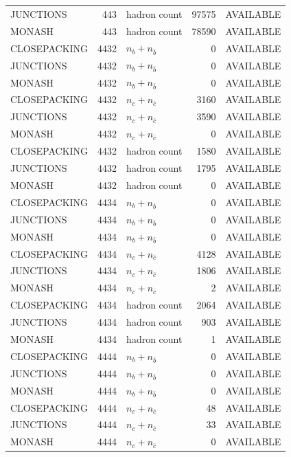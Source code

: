 \begin{landscape}
\begin{longtable}{@{}lrlrl@{}}
JUNCTIONS & 443 & hadron count & \num{97575} & AVAILABLE \\
MONASH & 443 & hadron count & \num{78590} & AVAILABLE \\
CLOSEPACKING & 4432 & $n_b+n_{\bar b}$ & \num{0} & AVAILABLE \\
JUNCTIONS & 4432 & $n_b+n_{\bar b}$ & \num{0} & AVAILABLE \\
MONASH & 4432 & $n_b+n_{\bar b}$ & \num{0} & AVAILABLE \\
CLOSEPACKING & 4432 & $n_c+n_{\bar c}$ & \num{3160} & AVAILABLE \\
JUNCTIONS & 4432 & $n_c+n_{\bar c}$ & \num{3590} & AVAILABLE \\
MONASH & 4432 & $n_c+n_{\bar c}$ & \num{0} & AVAILABLE \\
CLOSEPACKING & 4432 & hadron count & \num{1580} & AVAILABLE \\
JUNCTIONS & 4432 & hadron count & \num{1795} & AVAILABLE \\
MONASH & 4432 & hadron count & \num{0} & AVAILABLE \\
CLOSEPACKING & 4434 & $n_b+n_{\bar b}$ & \num{0} & AVAILABLE \\
JUNCTIONS & 4434 & $n_b+n_{\bar b}$ & \num{0} & AVAILABLE \\
MONASH & 4434 & $n_b+n_{\bar b}$ & \num{0} & AVAILABLE \\
CLOSEPACKING & 4434 & $n_c+n_{\bar c}$ & \num{4128} & AVAILABLE \\
JUNCTIONS & 4434 & $n_c+n_{\bar c}$ & \num{1806} & AVAILABLE \\
MONASH & 4434 & $n_c+n_{\bar c}$ & \num{2} & AVAILABLE \\
CLOSEPACKING & 4434 & hadron count & \num{2064} & AVAILABLE \\
JUNCTIONS & 4434 & hadron count & \num{903} & AVAILABLE \\
MONASH & 4434 & hadron count & \num{1} & AVAILABLE \\
CLOSEPACKING & 4444 & $n_b+n_{\bar b}$ & \num{0} & AVAILABLE \\
JUNCTIONS & 4444 & $n_b+n_{\bar b}$ & \num{0} & AVAILABLE \\
MONASH & 4444 & $n_b+n_{\bar b}$ & \num{0} & AVAILABLE \\
CLOSEPACKING & 4444 & $n_c+n_{\bar c}$ & \num{48} & AVAILABLE \\
JUNCTIONS & 4444 & $n_c+n_{\bar c}$ & \num{33} & AVAILABLE \\
MONASH & 4444 & $n_c+n_{\bar c}$ & \num{0} & AVAILABLE \\

\end{longtable}
\end{landscape}
